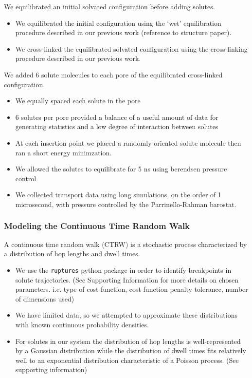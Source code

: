 \documentclass{article}
\begin{document}
  We equilibrated an initial solvated configuration before adding solutes.
  \begin{itemize}
	\item We equilibrated the initial configuration using the `wet'
	equilibration procedure described in our previous work (reference to structure
	paper).
	\item We cross-linked the equilibrated solvated configuration using the
	cross-linking procedure described in our previous work. 
  \end{itemize}

  We added 6 solute molecules to each pore of the equilibrated cross-linked
  configuration.
  \begin{itemize}
	\item We equally spaced each solute in the pore
	\item 6 solutes per pore provided a balance of a useful amount of data
	for generating statistics and a low degree of interaction between solutes
	\item At each insertion point we placed a randomly oriented solute molecule
	then ran a short energy minimzation.
	\item We allowed the solutes to equilibrate for 5 ns using berendsen 
	pressure control
	\item We collected transport data using long simulations, on the order of
	1 microsecond, with pressure controlled by the Parrinello-Rahman barostat.
  \end{itemize}
  
  \subsubsection*{Modeling the Continuous Time Random Walk}\label{method:CTRW}

  A continuous time random walk (CTRW) is a stochastic process characterized by a 
  distribution of hop lengths and dwell times.
  \begin{itemize}
	\item We use the \texttt{ruptures} python package in order to identify
	breakpoints in solute trajectories. (See Supporting Information for more
	details on chosen parameters. i.e. type of cost function, cost function penalty
	tolerance, number of dimensions used)
	\item We have limited data, so we attempted to approximate these distributions
	with known continuous probability densities.
	\item For solutes in our system the distribution of hop lengths is
	well-represented by a Gaussian distribution while the distribution of dwell
	times fits relatively well to an exponential distribution characteristic of a
	Poisson process. (See supporting information)
  \end{itemize}
\end{document}
